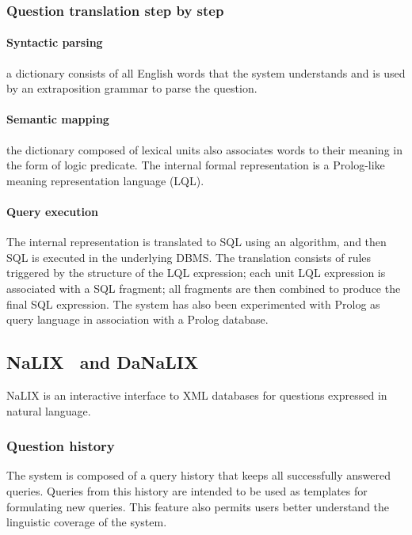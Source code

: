 \documentclass[10pt,journal,letterpaper,compsoc]{IEEEtran}
\begin{document}
\subsubsection{Question translation step by step}
\paragraph{Syntactic parsing}
a dictionary consists of all English words that the
system understands and is used by an extraposition grammar to parse the
question.
\paragraph{Semantic mapping}
the dictionary composed of lexical units
also associates words to their meaning in the form of logic predicate.
The internal formal representation is a Prolog-like meaning
representation language (LQL).
\paragraph{Query execution}
The internal representation is translated to
SQL using an algorithm, and then SQL is executed in the underlying DBMS.
The translation consists of rules triggered by the structure of the LQL
expression; each unit LQL expression is associated with a SQL fragment; all
fragments are then combined to produce the final SQL expression.
The system has also been experimented with Prolog as query language in
association with a Prolog database.














\subsection{{\sc NaLIX}~\cite{Li:2005:NIN:1066157.1066281} and {\sc
DaNaLIX}~\cite{Li:2007:DDN:1247480.1247643}}
{\sc NaLIX} is an interactive interface to XML databases for questions expressed
in natural language.

\subsubsection{Question history}
The system is composed of a query history that keeps all
successfully answered queries. Queries from this history are intended to be
used as templates for formulating new queries. This feature also permits users
better understand the linguistic coverage of the system.
\end{document}
